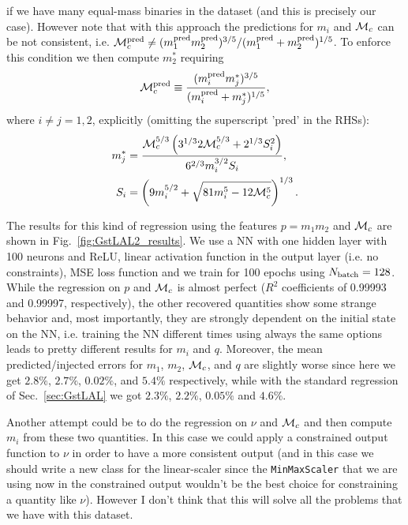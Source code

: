 \documentclass[prd,aps,twocolumn,a4paper,showkeys,nofootinbib]{article}
\def\Mc{{\cal M}_c}
\begin{document}
if we have many equal-mass binaries in the dataset (and this is precisely our case).
However note that with this approach the predictions for $m_i$ and $\Mc$ can be not
consistent, i.e. 
$\Mc^{\rm pred} \neq (m_1^{\rm pred} m_2^{\rm pred})^{3/5}/(m_1^{\rm pred} + m_2^{\rm pred})^{1/5}$.
To enforce this condition we then compute $m_2^*$ requiring 
\begin{equation}
\Mc^{\rm pred} \equiv \frac{(m_i^{\rm pred} m_j^*)^{3/5}}{(m_i^{\rm pred} + m_j^{*})^{1/5}},
\end{equation}
where $i\neq j=1,2$, explicitly (omitting the superscript 'pred' in the RHSs):
\begin{align}
m_j^* &= \frac{\Mc^{5/3}\left(3^{1/3} 2 \Mc^{5/3}+2^{1/3} S_i^2 \right) }{ 6^{2/3} m_i^{3/2} S_i },  \\
S_i   &= \left(9 m_i^{5/2} + \sqrt{81 m_i^5 -12 \Mc^5}\right)^{1/3}.
\end{align}

The results for this kind of regression using the features $p=m_1 m_2$ and $\Mc$
are shown in Fig.~\ref{fig:GstLAL2_results}. We use a NN with one hidden layer with 
100 neurons and ReLU, linear activation function in the output layer (i.e. no constraints),
MSE loss function and we train for 100 epochs using $N_{\rm batch}=128$. 
While the regression on $p$ and $\Mc$ is almost perfect ($R^2$ coefficients of 0.99993 and 
0.99997, respectively), the other recovered quantities show some strange behavior and, most
importantly, they are strongly dependent on the initial state on the NN, i.e. training the NN
different times using always the same options leads to pretty different results for $m_i$ and $q$.
Moreover, the mean predicted/injected errors for $m_1$, $m_2$, $\Mc$, and $q$ are slightly worse 
since here we get $2.8\%$, $2.7\%$, $0.02\%$, and $5.4\%$ respectively, while with the standard 
regression of Sec.~\ref{sec:GstLAL} we got $2.3\%$, $2.2\%$, $0.05\%$ and $4.6\%$.

Another attempt could be to do the regression on $\nu$ and $\Mc$ and then compute $m_i$
from these two quantities. 
In this case we could apply a constrained output function to $\nu$  in order to have a more
consistent output
(and in this case we should write a new class for the linear-scaler since the 
\texttt{MinMaxScaler} that we are using now in the constrained output wouldn't be the best 
choice for constraining a quantity like $\nu$). 
However I don't think that this will solve all the problems that we have
with this dataset.
\end{document}
